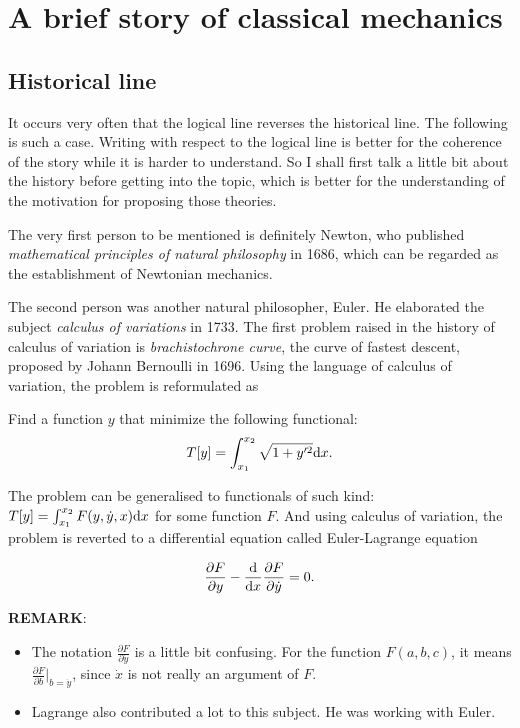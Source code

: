 \section{A brief story of classical mechanics}
\subsection{Historical line}
It occurs very often that the logical line reverses the historical line. The following is such a case. Writing with respect to the logical line is better for the coherence of the story while it is harder to understand. So I shall first talk a little bit about the history before getting into the topic, which is better for the understanding of the motivation for proposing those theories.

The very first person to be mentioned is definitely Newton, who published \textit{mathematical principles of natural philosophy} in 1686, which can be regarded as the establishment of Newtonian mechanics.

The second person was another natural philosopher, Euler. He elaborated the subject \textit{calculus of variations} in 1733. The first problem raised in the history of calculus of variation is \textit{brachistochrone curve}, the curve of fastest descent, proposed by Johann Bernoulli in 1696. Using the language of calculus of variation, the problem is reformulated as

\begin{center}
    Find a function $y$ that minimize the following functional:
    \begin{equation}
        T[y] = \int_{x_1}^{x_2} \sqrt{1+y'^2} \mathrm{d} x.
    \end{equation}
\end{center}

The problem can be generalised to functionals of such kind: $T[y]=\int_{x_1}^{x_2}F(y,\dot{y},x)\mathrm{d} x$ for some function $F$. And using calculus of variation, the problem is reverted to a differential equation called Euler-Lagrange equation

\begin{equation}
    \label{eq2.2}
    \frac{\partial F}{\partial y} - \frac{\mathrm{d}}{\mathrm{d} x}\frac{\partial F}{\partial \dot{y}} = 0.
\end{equation}

\textbf{REMARK}:
\begin{itemize}
    \item The notation $\frac{\partial F}{\partial \dot{y}}$ is a little bit confusing. For the function $F(a, b, c)$, it means $\frac{\partial F}{\partial b}\big \vert_{b=\dot{y}}$, since $\dot{x}$ is not really an argument of $F$.
    \item Lagrange also contributed a lot to this subject. He was working with Euler.
\end{itemize}

